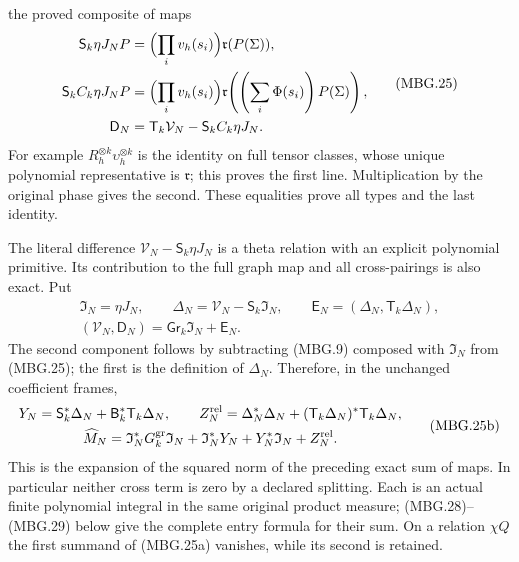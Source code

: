 the proved composite of maps
\[
 \begin{split}
 \mathsf S_k\eta J_NP&=\Bigl(\prod_i v_h(s_i)\Bigr)\mathfrak r(P(\Sigma)),\\
 \mathsf S_k C_k\eta J_NP&=
  \Bigl(\prod_i v_h(s_i)\Bigr)
          \mathfrak r\!\left(\left(\sum_i\Phi(s_i)\right)P(\Sigma)\right),\\
 \mathsf D_N&=\mathsf T_k\mathcal V_N-\mathsf S_k C_k\eta J_N .
 \end{split}
 \tag{MBG.25}\label{GraphV2:eq:mbg-strict-window-map}
\]
For example \(R_h^{\otimes k}\upsilon_h^{\otimes k}\) is the identity
on full tensor classes, whose unique polynomial representative is
\(\mathfrak r\); this proves the first line. Multiplication by the
original phase gives the second. These equalities prove all types
and the last identity.

The literal difference
\(\mathcal V_N-\mathsf S_k\eta J_N\) is a theta relation with an
explicit polynomial primitive. Its contribution to the full graph map
and all cross-pairings is also exact. Put
\[
 \begin{gathered}
 \mathfrak I_N=\eta J_N,\qquad
 \Delta_N=\mathcal V_N-\mathsf S_k\mathfrak I_N,\qquad
 \mathsf E_N=(\Delta_N,\mathsf T_k\Delta_N),\\
 (\mathcal V_N,\mathsf D_N)
      =\mathsf{Gr}_k\mathfrak I_N+\mathsf E_N .
 \end{gathered}
 \tag{MBG.25a}\label{GraphV2:eq:mbg-graph-relation-composite}
\]
The second component follows by subtracting (MBG.9) composed with
\(\mathfrak I_N\) from (MBG.25); the first is the definition of
\(\Delta_N\). Therefore, in the unchanged coefficient frames,
\[
 \begin{gathered}
 Y_N=\mathsf S_k^*\Delta_N+
                   \mathsf B_k^*\mathsf T_k\Delta_N,\qquad
 Z_N^{\rm rel}=\Delta_N^*\Delta_N+
                  (\mathsf T_k\Delta_N)^*\mathsf T_k\Delta_N,\\
 \widehat M_N=\mathfrak I_N^*G_k^{\rm gr}\mathfrak I_N
     +\mathfrak I_N^*Y_N+Y_N^*\mathfrak I_N+Z_N^{\rm rel}.
 \end{gathered}
 \tag{MBG.25b}\label{GraphV2:eq:mbg-graph-relation-cross}
\]
This is the expansion of the squared norm of the preceding exact
sum of maps. In particular neither cross term is zero by a declared
splitting. Each is an actual finite polynomial integral in the same
original product measure; (MBG.28)--(MBG.29) below give the complete
entry formula for their sum. On a relation \(\chi Q\) the first
summand of (MBG.25a) vanishes, while its second is retained.

